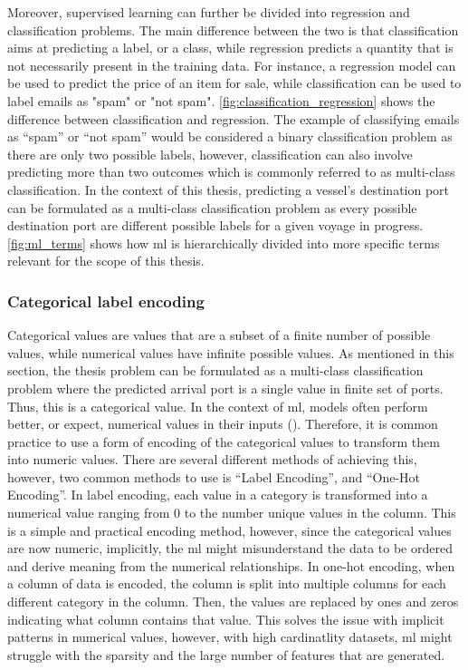 Moreover, supervised learning can further be divided into regression and classification problems. The main difference between the two is that classification aims at predicting a label, or a class, while regression predicts a quantity that is not necessarily present in the training data. For instance, a regression model can be used to predict the price of an item for sale, while classification can be used to label emails as "spam" or "not spam". \cref{fig:classification_regression} shows the difference between classification and regression. The example of classifying emails as ``spam'' or ``not spam'' would be considered a binary classification problem as there are only two possible labels, however, classification can also involve predicting more than two outcomes which is commonly referred to as multi-class classification. In the context of this thesis, predicting a vessel's destination port can be formulated as a multi-class classification problem as every possible destination port are different possible labels for a given voyage in progress. \cref{fig:ml_terms} shows how \acrshort{ml} is hierarchically divided into more specific terms relevant for the scope of this thesis.

\subsubsection{Categorical label encoding}
\label{sec:label_encoding}

Categorical values are values that are a subset of a finite number of possible values, while numerical values have infinite possible values. As mentioned in this section, the thesis problem can be formulated as a multi-class classification problem where the predicted arrival port is a single value in finite set of ports. Thus, this is a categorical value. In the context of \acrshort{ml}, models often perform better, or expect, numerical values in their inputs (). Therefore, it is common practice to use a form of encoding of the categorical values to transform them into numeric values. There are several different methods of achieving this, however, two common methods to use is ``Label Encoding'', and ``One-Hot Encoding''. In label encoding, each value in a category is transformed into a numerical value ranging from 0 to the number unique values in the column. This is a simple and practical encoding method, however, since the categorical values are now numeric, implicitly, the \acrshort{ml} might misunderstand the data to be ordered and derive meaning from the numerical relationships. In one-hot encoding, when a column of data is encoded, the column is split into multiple columns for each different category in the column. Then, the values are replaced by ones and zeros indicating what column contains that value. This solves the issue with implicit patterns in numerical values, however, with high cardinatlity datasets, \acrshort{ml} might struggle with the sparsity and the large number of features that are generated.


